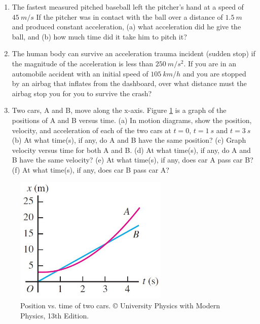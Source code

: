 \documentclass[12pt]{article}
\begin{document}
\begin{enumerate}
  \item The fastest measured pitched baseball left
  the pitcher’s hand at a speed of $45~m/s$ If the pitcher was in
  contact with the ball over a distance of $1.5~m$ and produced constant
  acceleration, (a) what acceleration did he give the ball, and
  (b) how much time did it take him to pitch it?
  \item The human body can survive
  an acceleration trauma incident (sudden stop) if the magnitude
  of the acceleration is less than $250~m/s^2$. If you are in an automobile
  accident with an initial speed of $105~km/h$
  and you are stopped by an airbag that inflates from the dashboard,
  over what distance must the airbag stop you for you to survive
  the crash?
\item Two cars, A and B, move
along the x-axis. Figure \ref{1} is
a graph of the positions of A and
B versus time. (a) In motion diagrams, show the position, velocity,
and acceleration of each of
the two cars at $t=0$, $t=1~s$
and $t=3~s$ (b) At what time(s),
if any, do A and B have the same
position? (c) Graph velocity versus
time for both A and B. (d) At what time(s), if any, do A and B
have the same velocity? (e) At what time(s), if any, does car A pass
car B? (f) At what time(s), if any, does car B pass car A?
\end{enumerate}



\begin{figure}[h!]
  
  \includegraphics[width=0.65\textwidth]{images/1.jpg}
  \caption{ Position vs. time of two cars. 
  {\tiny © University Physics  with Modern Physics, 13th Edition.} }
  \label{1}
\end{figure}
\end{document}
